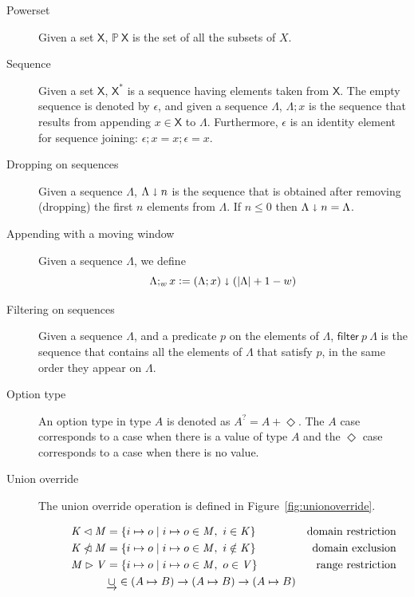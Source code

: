 \documentclass[11pt,a4paper]{article}
\newcommand{\powerset}[1]{\mathbb{P}~#1}
\newcommand{\restrictdom}{\lhd}
\newcommand{\subtractdom}{\mathbin{\slashed{\restrictdom}}}
\newcommand{\restrictrange}{\rhd}
\newcommand{\unionoverride}{\mathbin{\underrightarrow\cup}}
\newcommand{\var}[1]{\mathit{#1}}
\newcommand{\fun}[1]{\mathsf{#1}}
\newcommand{\type}[1]{\mathsf{#1}}
\newcommand{\size}[1]{\left| #1 \right|}
\newcommand{\seqof}[1]{#1^{*}}
\newcommand{\leteq}{\ensuremath{\mathrel{\mathop:}=}}
\newcommand{\Nothing}{\Diamond}
\begin{document}
\begin{description}
\item[Powerset] Given a set $\type{X}$, $\powerset{\type{X}}$ is the set of all
  the subsets of $X$.
\item[Sequence] Given a set $\type{X}$, $\seqof{\type{X}}$ is a sequence
  having elements taken from $\type{X}$.
  The empty sequence is denoted by $\epsilon$, and given a sequence $\Lambda$,
  $\Lambda; x$ is the sequence that results from appending
  $x \in \type{X}$ to $\Lambda$.
  Furthermore, $\epsilon$ is an identity element for sequence joining:
  $\epsilon; x = x; \epsilon = x$.
\item[Dropping on sequences] Given a sequence $\Lambda$,
  $\Lambda \shortdownarrow n$ is the sequence that is obtained after removing
  (dropping) the first $n$ elements from $\Lambda$. If $n \leq 0$ then
  $\Lambda \shortdownarrow n = \Lambda$.
\item[Appending with a moving window] Given a sequence $\Lambda$, we define
  $$\Lambda ;_w x \leteq (\Lambda; x) \shortdownarrow (\size{\Lambda} + 1 - w)$$
\item[Filtering on sequences] Given a sequence $\Lambda$, and a predicate $p$
  on the elements of $\Lambda$, $\fun{filter}~p~\Lambda$ is the sequence that
  contains all the elements of $\Lambda$ that satisfy $p$, in the same order
  they appear on $\Lambda$.
\item[Option type] An option type in type $A$ is denoted as $A^? = A + \Nothing$. The
  $A$ case corresponds to a case when there is a value of type $A$ and the $\Nothing$
  case corresponds to a case when there is no value.
\item[Union override] The union override operation is defined in
  Figure~\ref{fig:unionoverride}.
  \begin{figure}
    \begin{align*}
      \var{K} \restrictdom \var{M}
      & = \{ i \mapsto o \mid i \mapsto o \in \var{M}, ~ i \in \var{K} \}
      & \text{domain restriction}
      \\
      \var{K} \subtractdom \var{M}
      & = \{ i \mapsto o \mid i \mapsto o \in \var{M}, ~ i \notin \var{K} \}
      & \text{domain exclusion}
      \\
      \var{M} \restrictrange \var{V}
      & = \{ i \mapsto o \mid i \mapsto o \in \var{M}, ~ o \in \var{V} \}
      & \text{range restriction}
      \\
      & \unionoverride \in (A \mapsto B) \to (A \mapsto B) \to (A \mapsto B)

\end{align*}
\end{figure}
\end{description}
\end{document}
